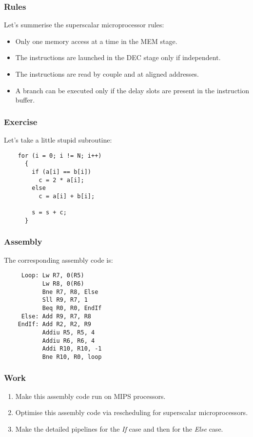 
\begin{frame}
  \frametitle{Rules}

  Let's summerise the superscalar microprocessor rules:

  \begin{itemize}
    \item
      Only one memory access at a time in the MEM stage.
    \item
      The instructions are launched in the DEC stage only if independent.
    \item
      The instructions are read by couple and at aligned addresses.
    \item
      A branch can be executed only if the delay slots are present in the
      instruction buffer.
  \end{itemize}
\end{frame}


\begin{frame}[containsverbatim]
  \frametitle{Exercise}

  Let's take a little stupid subroutine:

  \begin{verbatim}
    for (i = 0; i != N; i++)
      {
        if (a[i] == b[i])
          c = 2 * a[i];
        else
          c = a[i] + b[i];

        s = s + c;
      }
  \end{verbatim}
\end{frame}


\begin{frame}[containsverbatim]
  \frametitle{Assembly}

  The corresponding assembly code is:

  \begin{verbatim}
     Loop: Lw R7, 0(R5)
           Lw R8, 0(R6)
           Bne R7, R8, Else
           Sll R9, R7, 1
           Beq R0, R0, EndIf
     Else: Add R9, R7, R8
    EndIf: Add R2, R2, R9
           Addiu R5, R5, 4
           Addiu R6, R6, 4
           Addi R10, R10, -1
           Bne R10, R0, loop
  \end{verbatim}
\end{frame}


\begin{frame}
  \frametitle{Work}

  \begin{enumerate}
    \item
      Make this assembly code run on MIPS processors.
    \item
      Optimise this assembly code via rescheduling for superscalar
      microprocessors.
    \item
      Make the detailed pipelines for the \textit{If} case and then for
      the \textit{Else} case.
  \end{enumerate}
\end{frame}

